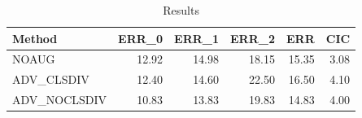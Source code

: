 \begin{table}
\caption{Results}
\label{tab:Results}
\begin{tabular}{lrrrrr}
\toprule
Method & ERR\_0 & ERR\_1 & ERR\_2 & ERR & CIC \\
\midrule
NOAUG & 12.92 & 14.98 & 18.15 & 15.35 & 3.08 \\
ADV\_CLSDIV & 12.40 & 14.60 & 22.50 & 16.50 & 4.10 \\
ADV\_NOCLSDIV & 10.83 & 13.83 & 19.83 & 14.83 & 4.00 \\
\bottomrule
\end{tabular}
\end{table}

